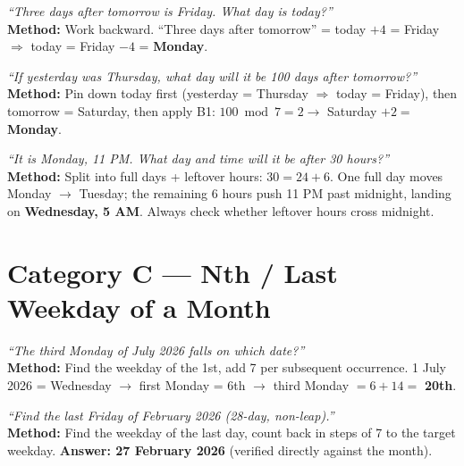 \documentclass[11pt]{article}
\begin{document}
\begin{examplebox}
\emph{``Three days after tomorrow is Friday. What day is today?''} \\
\textbf{Method:} Work backward. ``Three days after tomorrow'' = today $+4$ = Friday
$\Rightarrow$ today = Friday $-4$ = \textbf{Monday}.
\end{examplebox}

\begin{examplebox}
\emph{``If yesterday was Thursday, what day will it be 100 days after tomorrow?''} \\
\textbf{Method:} Pin down today first (yesterday = Thursday $\Rightarrow$ today = Friday), then
tomorrow = Saturday, then apply B1: $100 \bmod 7 = 2 \to$ Saturday $+2 = $ \textbf{Monday}.
\end{examplebox}

\begin{examplebox}
\emph{``It is Monday, 11 PM. What day and time will it be after 30 hours?''} \\
\textbf{Method:} Split into full days + leftover hours: $30 = 24+6$. One full day moves Monday
$\to$ Tuesday; the remaining 6 hours push 11 PM past midnight, landing on
\textbf{Wednesday, 5 AM}. Always check whether leftover hours cross midnight.
\end{examplebox}

\section{Category C --- Nth / Last Weekday of a Month}

\begin{examplebox}
\emph{``The third Monday of July 2026 falls on which date?''} \\
\textbf{Method:} Find the weekday of the 1st, add 7 per subsequent occurrence.
1 July 2026 = Wednesday $\to$ first Monday = 6th $\to$ third Monday $= 6+14 = $ \textbf{20th}.
\end{examplebox}

\begin{examplebox}
\emph{``Find the last Friday of February 2026 (28-day, non-leap).''} \\
\textbf{Method:} Find the weekday of the last day, count back in steps of 7 to the target weekday.
\textbf{Answer: 27 February 2026} (verified directly against the month).
\end{examplebox}
\end{document}
